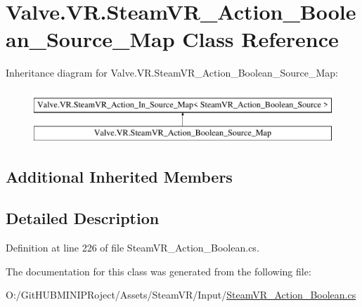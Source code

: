 \hypertarget{class_valve_1_1_v_r_1_1_steam_v_r___action___boolean___source___map}{}\section{Valve.\+V\+R.\+Steam\+V\+R\+\_\+\+Action\+\_\+\+Boolean\+\_\+\+Source\+\_\+\+Map Class Reference}
\label{class_valve_1_1_v_r_1_1_steam_v_r___action___boolean___source___map}
Inheritance diagram for Valve.\+V\+R.\+Steam\+V\+R\+\_\+\+Action\+\_\+\+Boolean\+\_\+\+Source\+\_\+\+Map\+:\begin{figure}[H]
\begin{center}
\leavevmode
\includegraphics[height=2.000000cm]{class_valve_1_1_v_r_1_1_steam_v_r___action___boolean___source___map}
\end{center}
\end{figure}
\subsection*{Additional Inherited Members}


\subsection{Detailed Description}


Definition at line 226 of file Steam\+V\+R\+\_\+\+Action\+\_\+\+Boolean.\+cs.



The documentation for this class was generated from the following file\+:\begin{DoxyCompactItemize}
\item 
O\+:/\+Git\+H\+U\+B\+M\+I\+N\+I\+P\+Roject/\+Assets/\+Steam\+V\+R/\+Input/\mbox{\hyperlink{_steam_v_r___action___boolean_8cs}{Steam\+V\+R\+\_\+\+Action\+\_\+\+Boolean.\+cs}}\end{DoxyCompactItemize}
